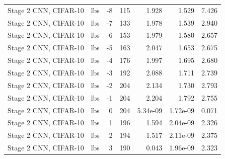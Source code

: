 \begin{table}[htbp]
{\begin{tabular}{@{}llrrrrr@{}}
Stage 2 CNN, CIFAR-10 & lbs & -8 & 115 & 1.928 & 1.529 & 7.426 \\
Stage 2 CNN, CIFAR-10 & lbs & -7 & 133 & 1.978 & 1.539 & 2.940 \\
Stage 2 CNN, CIFAR-10 & lbs & -6 & 153 & 1.979 & 1.580 & 2.657 \\
Stage 2 CNN, CIFAR-10 & lbs & -5 & 163 & 2.047 & 1.653 & 2.675 \\
Stage 2 CNN, CIFAR-10 & lbs & -4 & 176 & 1.997 & 1.695 & 2.680 \\
Stage 2 CNN, CIFAR-10 & lbs & -3 & 192 & 2.088 & 1.711 & 2.739 \\
Stage 2 CNN, CIFAR-10 & lbs & -2 & 204 & 2.134 & 1.730 & 2.793 \\
Stage 2 CNN, CIFAR-10 & lbs & -1 & 204 & 2.204 & 1.792 & 2.755 \\
Stage 2 CNN, CIFAR-10 & lbs & 0 & 204 & 5.34e-09 & 1.72e-09 & 0.071 \\
Stage 2 CNN, CIFAR-10 & lbs & 1 & 196 & 1.594 & 2.04e-09 & 2.326 \\
Stage 2 CNN, CIFAR-10 & lbs & 2 & 194 & 1.517 & 2.11e-09 & 2.375 \\
Stage 2 CNN, CIFAR-10 & lbs & 3 & 190 & 0.043 & 1.96e-09 & 2.323 \\
\bottomrule
\end{tabular}}
\end{table}
